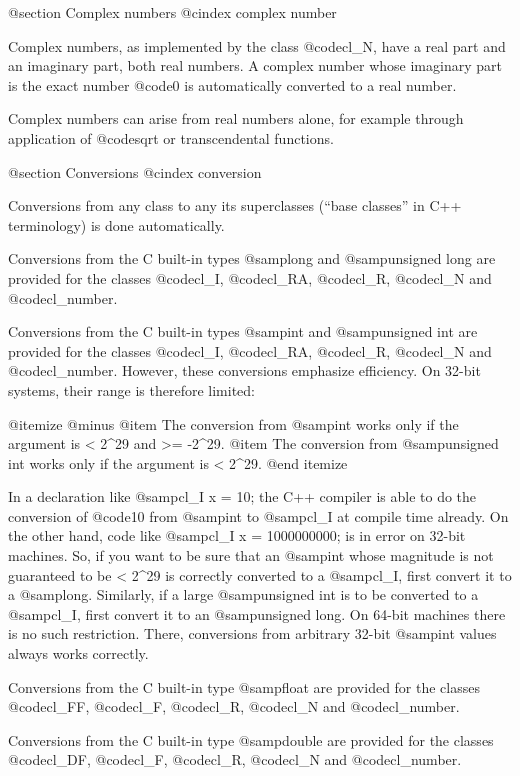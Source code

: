 @section Complex numbers
@cindex complex number

Complex numbers, as implemented by the class @code{cl_N}, have a real
part and an imaginary part, both real numbers. A complex number whose
imaginary part is the exact number @code{0} is automatically converted
to a real number.

Complex numbers can arise from real numbers alone, for example
through application of @code{sqrt} or transcendental functions.


@section Conversions
@cindex conversion

Conversions from any class to any its superclasses (``base classes'' in
C++ terminology) is done automatically.

Conversions from the C built-in types @samp{long} and @samp{unsigned long}
are provided for the classes @code{cl_I}, @code{cl_RA}, @code{cl_R},
@code{cl_N} and @code{cl_number}.

Conversions from the C built-in types @samp{int} and @samp{unsigned int}
are provided for the classes @code{cl_I}, @code{cl_RA}, @code{cl_R},
@code{cl_N} and @code{cl_number}. However, these conversions emphasize
efficiency. On 32-bit systems, their range is therefore limited:

@itemize @minus
@item
The conversion from @samp{int} works only if the argument is < 2^29 and >= -2^29.
@item
The conversion from @samp{unsigned int} works only if the argument is < 2^29.
@end itemize

In a declaration like @samp{cl_I x = 10;} the C++ compiler is able to
do the conversion of @code{10} from @samp{int} to @samp{cl_I} at compile time
already. On the other hand, code like @samp{cl_I x = 1000000000;} is
in error on 32-bit machines.
So, if you want to be sure that an @samp{int} whose magnitude is not guaranteed
to be < 2^29 is correctly converted to a @samp{cl_I}, first convert it to a
@samp{long}. Similarly, if a large @samp{unsigned int} is to be converted to a
@samp{cl_I}, first convert it to an @samp{unsigned long}. On 64-bit machines
there is no such restriction. There, conversions from arbitrary 32-bit @samp{int}
values always works correctly.

Conversions from the C built-in type @samp{float} are provided for the classes
@code{cl_FF}, @code{cl_F}, @code{cl_R}, @code{cl_N} and @code{cl_number}.

Conversions from the C built-in type @samp{double} are provided for the classes
@code{cl_DF}, @code{cl_F}, @code{cl_R}, @code{cl_N} and @code{cl_number}.

